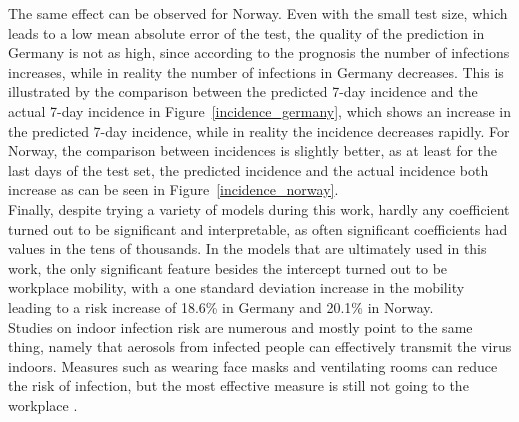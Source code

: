 The same effect can be observed for Norway. Even with the small test size, which leads to a low mean absolute error of the test, the quality of the prediction in Germany is not as high, since according to the prognosis the number of infections increases, while in reality the number of infections in Germany decreases. This is illustrated by the comparison between the predicted 7-day incidence and the actual 7-day incidence in Figure~\ref{incidence_germany}, which shows an increase in the predicted 7-day incidence, while in reality the incidence decreases rapidly. For Norway, the comparison between incidences is slightly better, as at least for the last days of the test set, the predicted incidence and the actual incidence both increase as can be seen in Figure~\ref{incidence_norway}. \\
Finally, despite trying a variety of models during this work, hardly any coefficient turned out to be significant and interpretable, as often significant coefficients had values in the tens of thousands. In the models that are ultimately used in this work, the only significant feature besides the intercept turned out to be workplace mobility, with a one standard deviation increase in the mobility leading to a risk increase of 18.6\% in Germany and 20.1\% in Norway. \\
Studies on indoor infection risk are numerous and mostly point to the same thing, namely that aerosols from infected people can effectively transmit the virus indoors. Measures such as wearing face masks and ventilating rooms can reduce the risk of infection, but the most effective measure is still not going to the workplace \autocite[][]{lelieveld2020model, bedford2020covid, hall2020covid}.